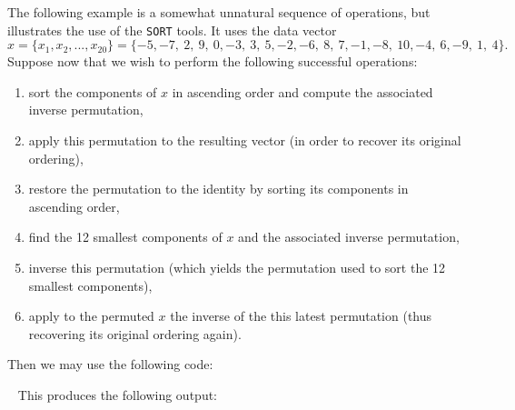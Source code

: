 \documentclass{galahad}
\newcommand{\packagename}{SORT}
\begin{document}

\galexample
The following example is a somewhat unnatural sequence of operations, but
illustrates the use of the {\tt \packagename} tools. It uses the data vector
\[
x = \{ x_1 ,   x_2 ,  ...  , x_{20} \} =
\{ -5,  -7,  ~2,  ~9,  ~0,  -3,  ~3,  ~5,  -2,  -6,
 ~8,  ~7,  -1,  -8,  ~10,  -4,  ~6,  -9,  ~1,  ~4 \}.
\]
Suppose now that we wish to perform the following successful operations:
\begin{enumerate}
\item sort the components of $x$ in ascending order and compute the associated
inverse permutation,
\item apply this permutation to the resulting vector (in order to recover its
original ordering),
\item restore the permutation to the identity by sorting its components in
ascending order,
\item find the 12 smallest components of $x$ and the associated inverse
permutation,
\item inverse this permutation (which yields the permutation used to sort the
12 smallest components),
\item
apply to the permuted $x$ the inverse of the this latest permutation (thus
recovering its original ordering again).
\end{enumerate}
Then we may use the following code:


{\tt \small
\VerbatimInput{\packageexample}
}
\noindent
This produces the following output:
{\tt \small
\VerbatimInput{\packageresults}
}
\end{document}
